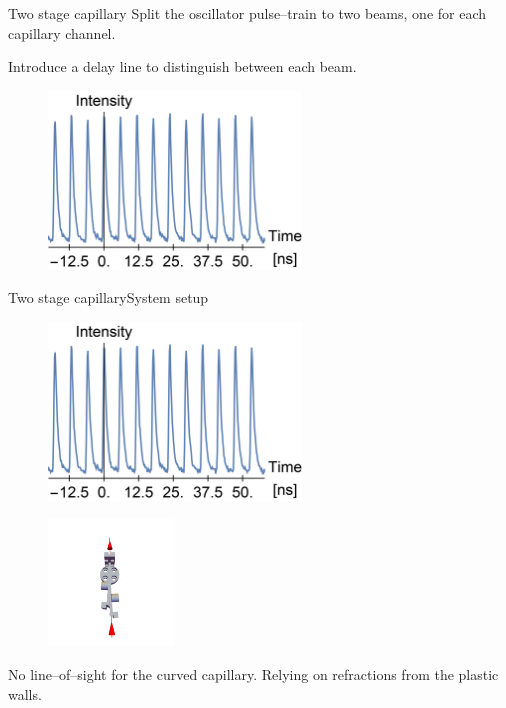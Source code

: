 \documentclass[]{beamer}
\begin{document}
  \begin{frame}{Two stage capillary}
    Split the oscillator pulse--train to two beams, one for each capillary channel.
    
    Introduce a delay line to distinguish between each beam.
    \begin{figure}
      \includegraphics[width=0.6\textwidth]{figures/results/2stageCapillary/double.png}
    \end{figure}
  \end{frame}
  \begin{frame}{Two stage capillary}{System setup}
    \begin{figure}
      \includegraphics[width=0.6\textwidth]{figures/results/2stageCapillary/double.png}
    \end{figure}
    \begin{figure}
      \includegraphics[width=0.3\textwidth]{figures/results/2stageCapillary/line-of-sight.png}
    \end{figure}
    No line--of--sight for the curved capillary. Relying on refractions from the plastic walls.
  \end{frame}
\end{document}
